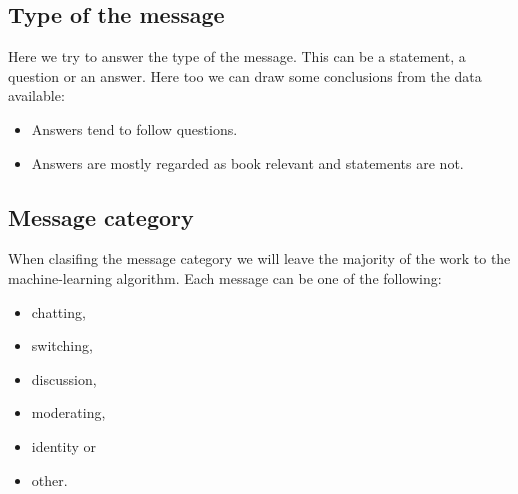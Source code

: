 \documentclass[11pt,a4paper]{article}
\newcommand{\taclpaper}{final version\xspace}
\newcommand{\taclpaper}{submission\xspace}
\begin{document}
\subsection{Type of the message}
Here we try to answer the type of the message. 
This can be a statement, a question or an answer.
Here too we can draw some conclusions from the data available:

\begin{itemize}
\item{Answers tend to follow questions.}
\item{Answers are mostly regarded as book relevant and statements are not.}
\end{itemize}

\subsection{Message category}

When clasifing the message category we will leave the majority of the work to the machine-learning algorithm.
Each message can be one of the following:
\begin{itemize}
\item{chatting,}
\item{switching,}
\item{discussion,}
\item{moderating,}
\item{identity or}
\item{other.}
\end{itemize}


\end{document}
